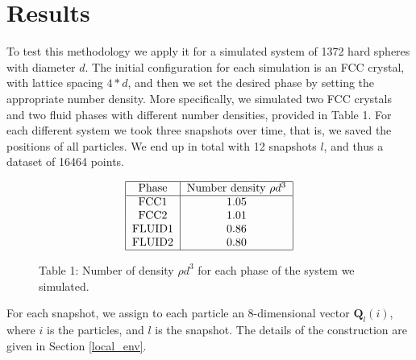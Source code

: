 \documentclass{article}
\begin{document}
\section{Results}\label{results}

To test this methodology we apply it for a simulated system of 1372 hard spheres with diameter $d$. The initial configuration for each simulation is an FCC crystal, with lattice spacing $4*d$, and then we set the desired phase by setting the appropriate number density. More specifically, we simulated two FCC crystals and two fluid phases with different number densities, provided in Table 1. For each different system we took three snapshots over time, that is, we saved the positions of all particles. We end up in total with 12 snapshots $l$, and thus a dataset of 16464 points.
\begin{figure}[ht!]
\begin{align}
	\begin{tabular}{|c|c|}
		\hline
		Phase & Number density $\rho d^3$\\
		\hline
		FCC1 & 1.05\\
		FCC2 & 1.01\\
		FLUID1 & 0.86\\
		FLUID2 & 0.80\\
		\hline
	\end{tabular}\nonumber
\end{align}
\caption*{Table 1: Number of density $\rho d^3$ for each phase of the system we simulated.} 
\end{figure}

For each snapshot, we assign to each particle an 8-dimensional vector $\bm{Q}_l(i)$, where $i$ is the particles, and $l$ is the snapshot. The details of the construction are given in Section \ref{local_env}.
\end{document}
